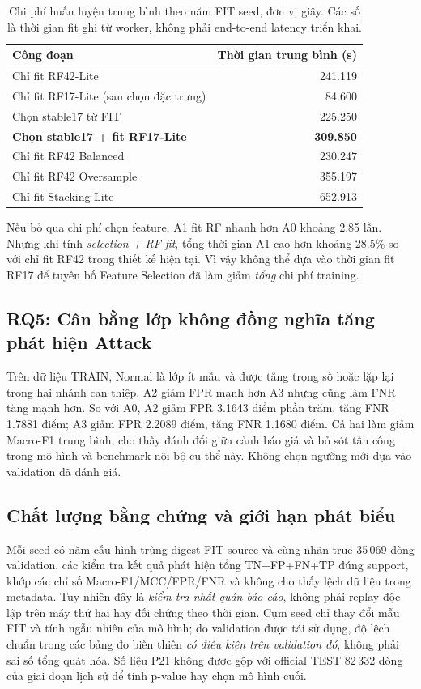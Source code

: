 \begin{table}[htbp]\centering\small
\renewcommand{\arraystretch}{1.22}
\caption{Chi phí huấn luyện trung bình theo năm FIT seed, đơn vị giây. Các số là thời gian fit ghi từ worker, không phải end-to-end latency triển khai.}
\label{tab:p21-cost}
\begin{tabular}{lr}\toprule
Công đoạn & Thời gian trung bình (s)\\\midrule
Chỉ fit RF42-Lite & 241.119\\
Chỉ fit RF17-Lite (sau chọn đặc trưng) & 84.600\\
Chọn stable17 từ FIT & 225.250\\
\textbf{Chọn stable17 + fit RF17-Lite} & \textbf{309.850}\\
Chỉ fit RF42 Balanced & 230.247\\
Chỉ fit RF42 Oversample & 355.197\\
Chỉ fit Stacking-Lite & 652.913\\\bottomrule
\end{tabular}
\end{table}
Nếu bỏ qua chi phí chọn feature, A1 fit RF nhanh hơn A0 khoảng 2.85 lần. Nhưng khi tính \emph{selection + RF fit}, tổng thời gian A1 cao hơn khoảng 28.5\% so với chỉ fit RF42 trong thiết kế hiện tại. Vì vậy không thể dựa vào thời gian fit RF17 để tuyên bố Feature Selection đã làm giảm \emph{tổng} chi phí training.

\subsection{RQ5: Cân bằng lớp không đồng nghĩa tăng phát hiện Attack}
Trên dữ liệu TRAIN, Normal là lớp ít mẫu và được tăng trọng số hoặc lặp lại trong hai nhánh can thiệp. A2 giảm FPR mạnh hơn A3 nhưng cũng làm FNR tăng mạnh hơn. So với A0, A2 giảm FPR 3.1643 điểm phần trăm, tăng FNR 1.7881 điểm; A3 giảm FPR 2.2089 điểm, tăng FNR 1.1680 điểm. Cả hai làm giảm Macro-F1 trung bình, cho thấy đánh đổi giữa cảnh báo giả và bỏ sót tấn công trong mô hình và benchmark nội bộ cụ thể này. Không chọn ngưỡng mới dựa vào validation đã đánh giá.

\subsection{Chất lượng bằng chứng và giới hạn phát biểu}
Mỗi seed có năm cấu hình trùng digest FIT source và cùng nhãn true 35\,069 dòng validation, các kiểm tra kết quả phát hiện tổng TN+FP+FN+TP đúng support, khớp các chỉ số Macro-F1/MCC/FPR/FNR và không cho thấy lệch dữ liệu trong metadata. Tuy nhiên đây là \emph{kiểm tra nhất quán báo cáo}, không phải replay độc lập trên máy thứ hai hay đối chứng theo thời gian. Cụm seed chỉ thay đổi mẫu FIT và tính ngẫu nhiên của mô hình; do validation được tái sử dụng, độ lệch chuẩn trong các bảng đo biến thiên \emph{có điều kiện trên validation đó}, không phải sai số tổng quát hóa. Số liệu P21 không được gộp với official TEST 82\,332 dòng của giai đoạn lịch sử để tính p-value hay chọn mô hình cuối.
